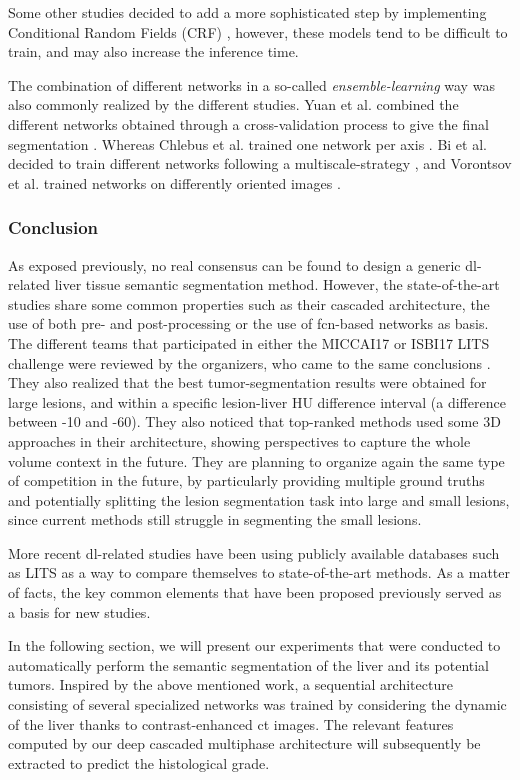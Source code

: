 Some other studies decided to add a more sophisticated step by
implementing Conditional Random Fields (CRF) \cite{Christ2017, Rafiei2018, Dou2016}, however, these models
tend to be difficult to train, and may also
increase the inference time.

The combination of different networks in a so-called
\emph{ensemble-learning} way was also commonly realized by the different
studies. Yuan et al. combined the different networks obtained
through a cross-validation process to give the final segmentation \cite{Yuan2017}.
Whereas Chlebus et al. trained one network per axis \cite{Chlebus2018}. Bi et al. decided to train different networks following a
multiscale-strategy \cite{Bi2017}, and Vorontsov et al. trained networks on
differently oriented images \cite{Vorontsov2018}.

\subsubsection{Conclusion}

As exposed previously, no real consensus can be found to design a
generic \ac{dl}-related liver tissue semantic segmentation method. However,
the state-of-the-art studies share some common properties such as their
cascaded architecture, the use of both pre- and post-processing or the
use of \ac{fcn}-based networks as basis.
The different teams that participated in either the MICCAI17 or ISBI17
LITS challenge were reviewed by the organizers, who came to the same
conclusions \cite{Bilic2019}.
They also realized that the best tumor-segmentation results were
obtained for large lesions, and within a specific lesion-liver HU
difference interval (a difference between -10 and -60).
They also noticed that top-ranked methods used some 3D approaches in
their architecture, showing perspectives to capture the whole
volume context in the future. They are planning to organize again the same
type of competition in the future, by particularly providing multiple
ground truths and potentially splitting the lesion segmentation task
into large and small lesions, since current methods still struggle in
segmenting the small lesions.

More recent \ac{dl}-related studies have been using publicly available
databases such as LITS as a way to compare themselves to
state-of-the-art methods. As a matter of facts, the key common elements
that have been proposed previously served as a basis for new studies.

In the following section, we will present our experiments that were conducted to automatically perform the semantic segmentation of the liver and its potential tumors. Inspired by the above mentioned work, a sequential architecture consisting of several specialized networks was trained by considering the dynamic of the liver thanks to contrast-enhanced \ac{ct} images. The relevant features computed by our deep cascaded multiphase architecture will subsequently be extracted to predict the histological grade.


